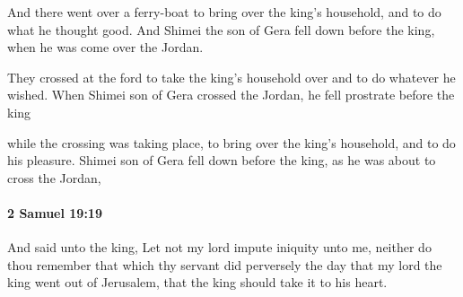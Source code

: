 			\begin{versebox}
					\item[BHS] 
					\item[ASV] And there went over a ferry-boat to bring over the king's household, and to do what he thought good. And Shimei the son of Gera fell down before the king, when he was come over the Jordan.
					\item[NIV] They crossed at the ford to take the king’s household over and to do whatever he wished. When Shimei son of Gera crossed the Jordan, he fell prostrate before the king
					\item[NRSV] while the crossing was taking place, to bring over the king’s household, and to do his pleasure. Shimei son of Gera fell down before the king, as he was about to cross the Jordan,
			\end{versebox}

		\paragraph{2 Samuel 19:19} %
			\label{2SAMUEL-19-19}

			And said unto the king, Let not my lord impute iniquity unto me, neither do thou remember that which thy servant did perversely the day that my lord the king went out of Jerusalem, that the king should take it to his heart.

